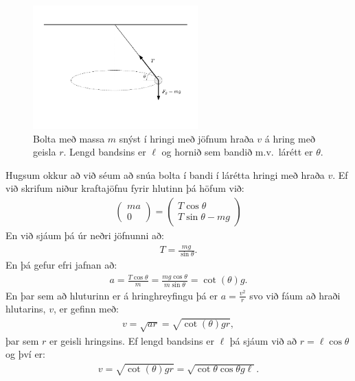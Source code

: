 \ifdefined \wholebook \else\documentclass[oneside]{book}\usepackage{EdlBook}\graphicspath{{figures/}}
\begin{document}
\begin{minipage}{\linewidth}
\begin{figure}
\vspace{-1cm}
\centering
\includegraphics[width=2.5in]{temp/togberthringbert.pdf}
\caption{Bolta með massa $m$ snýst í hringi með jöfnum hraða $v$ á hring með geisla $r$. Lengd bandsins er $\ell$ og hornið sem bandið m.v.~lárétt er $\theta$.}
\label{fig:togkraftshringhreyf}
\end{figure}

Hugsum okkur að við séum að snúa bolta í bandi í lárétta hringi með hraða $v$. Ef við skrifum niður kraftajöfnu fyrir hlutinn þá höfum við:
\begin{align*}
    \begin{pmatrix} ma \\ 0 \end{pmatrix} = \begin{pmatrix} T\cos\theta \\ T\sin\theta - mg \end{pmatrix}
\end{align*}
En við sjáum þá úr neðri jöfnunni að:
\begin{align*}
    T = \frac{mg}{\sin\theta}.
\end{align*}
En þá gefur efri jafnan að:
\begin{align*}
    a = \frac{T\cos\theta}{m} = \frac{mg \cos\theta}{m \sin\theta} = \cot(\theta) g.
\end{align*}
En þar sem að hluturinn er á hringhreyfingu þá er $a = \frac{v^2}{r}$ svo við fáum að hraði hlutarins, $v$, er gefinn með:
\begin{align*}
    v = \sqrt{ar} = \sqrt{\cot(\theta) gr},
\end{align*}
þar sem $r$ er geisli hringsins. Ef lengd bandsins er $\ell$ þá sjáum við að $r = \ell \cos\theta$ og því er:
\begin{align*}
    v = \sqrt{\cot(\theta) gr} = \sqrt{\cot\theta \cos\theta g \ell}.
\end{align*}

\end{minipage}
\end{document}
